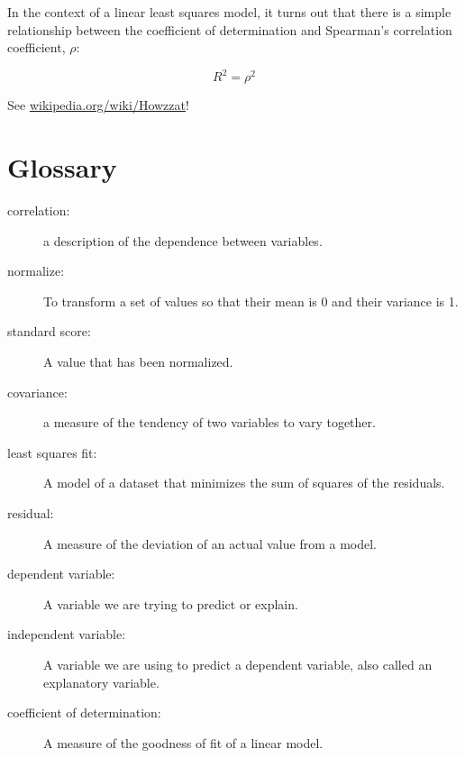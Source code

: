 \documentclass[12pt]{book}
\begin{document}
In the context of a linear least squares model, it turns out that
there is a simple relationship between the coefficient of
determination and Spearman's correlation coefficient, $\rho$:

\[ R^2 = \rho^2 \]

See \url{wikipedia.org/wiki/Howzzat}!







\section{Glossary}

\begin{description}

\item[correlation:] a description of the dependence between variables.

\item[normalize:] To transform a set of values so that their mean is 0 and
their variance is 1.

\item[standard score:] A value that has been normalized.

\item[covariance:] a measure of the tendency of two variables
to vary together.

\item[least squares fit:] A model of a dataset that minimizes the
sum of squares of the residuals.

\item[residual:] A measure of the deviation of an actual value from a model.

\item[dependent variable:] A variable we are trying to predict or explain.

\item[independent variable:] A variable we are using to predict a dependent
variable, also called an explanatory variable.

\item[coefficient of determination:] A measure of the goodness of fit
of a linear model.

\end{description}
\end{document}
